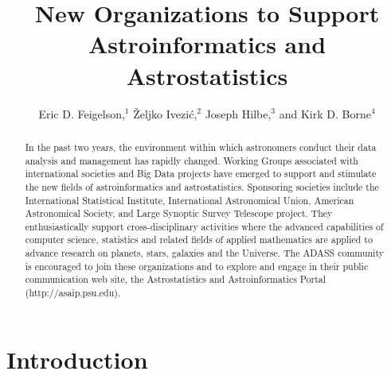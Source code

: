 
\resetcounters

\title{New Organizations to Support Astroinformatics and Astrostatistics}
\author{Eric D. Feigelson,$^1$ \v{Z}eljko Ivezi\'c,$^2$ Joseph Hilbe,$^3$ and Kirk D. Borne$^4$
}

\begin{abstract}
In the past two years, the environment within which astronomers conduct their data analysis and management has rapidly changed.  Working Groups associated with international societies and Big Data projects have emerged to support and stimulate the new fields of astroinformatics and astrostatistics.  Sponsoring societies include the International Statistical Institute, International Astronomical Union, American Astronomical Society, and Large Synoptic Survey Telescope project.  They enthusiastically support cross-disciplinary activities where the advanced capabilities of computer science, statistics and related fields of applied mathematics are applied to advance research on planets, stars, galaxies and the Universe.  The ADASS community is encouraged to join these organizations and to explore and engage in their public communication web site, the Astrostatistics and Astroinformatics Portal (http://asaip.psu.edu).  
\end{abstract}

\section{Introduction}

